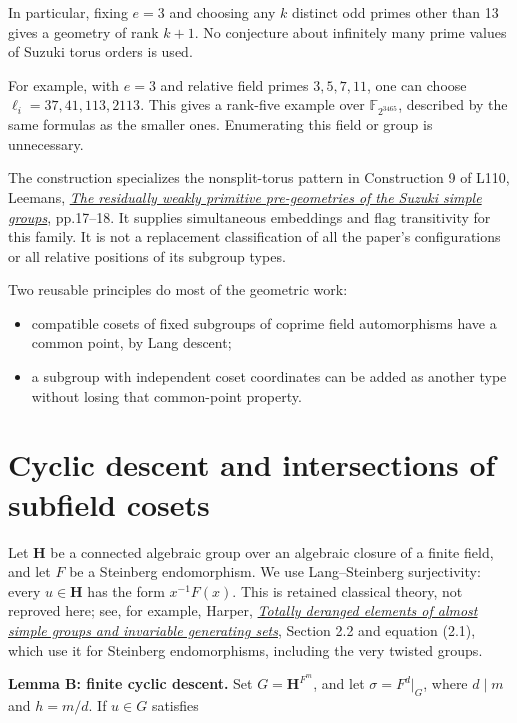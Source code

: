 \documentclass[11pt,a4paper]{article}
\providecommand{\tightlist}{\setlength{\itemsep}{0pt}\setlength{\parskip}{0pt}}
\begin{document}
In particular, fixing \(e=3\) and choosing any \(k\) distinct odd primes
other than 13 gives a geometry of rank \(k+1\). No conjecture about
infinitely many prime values of Suzuki torus orders is used.

For example, with \(e=3\) and relative field primes \(3,5,7,11\), one
can choose \(\ell_i=37,41,113,2113\). This gives a rank-five example
over \(\mathbb F_{2^{3465}}\), described by the same formulas as the
smaller ones. Enumerating this field or group is unnecessary.

The construction specializes the nonsplit-torus pattern in Construction
9 of L110, Leemans,
\href{https://ese-journals.unisalento.it/index.php/notemat/article/download/i15900932v20n1p1/995}{\emph{The
residually weakly primitive pre-geometries of the Suzuki simple
groups}}, pp.17--18. It supplies simultaneous embeddings and flag
transitivity for this family. It is not a replacement classification of
all the paper's configurations or all relative positions of its subgroup
types.

Two reusable principles do most of the geometric work:

\begin{itemize}
\tightlist
\item
  compatible cosets of fixed subgroups of coprime field automorphisms
  have a common point, by Lang descent;
\item
  a subgroup with independent coset coordinates can be added as another
  type without losing that common-point property.
\end{itemize}

\section{Cyclic descent and intersections of subfield
cosets}\label{cyclic-descent-and-intersections-of-subfield-cosets}

Let \(\mathbf H\) be a connected algebraic group over an algebraic
closure of a finite field, and let \(F\) be a Steinberg endomorphism. We
use Lang--Steinberg surjectivity: every \(u\in\mathbf H\) has the form
\(x^{-1}F(x)\). This is retained classical theory, not reproved here;
see, for example, Harper,
\href{https://doi.org/10.1112/jlms.12935}{\emph{Totally deranged
elements of almost simple groups and invariable generating sets}},
Section 2.2 and equation (2.1), which use it for Steinberg
endomorphisms, including the very twisted groups.

\textbf{Lemma B: finite cyclic descent.} Set \(G=\mathbf H^{F^m}\), and
let \(\sigma=F^d|_G\), where \(d\mid m\) and \(h=m/d\). If \(u\in G\)
satisfies
\end{document}
